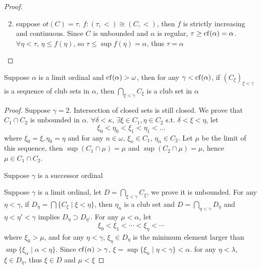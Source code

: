 \documentclass[11pt]{article}
\begin{document}
\begin{proof}
\begin{enumerate}
\setcounter{enumi}{1}
\item suppose \(ot(C)=\tau\). \(f:(\tau,<)\cong(C,<)\), then \(f\) is strictly increasing and
continuous. Since \(C\) is unbounded and \(\alpha\) is regular, \(\tau\ge\operatorname{cf}(\alpha)=\alpha\). \(\forall\eta<\tau\), \(\eta\le f(\eta)\),
so \(\tau\le\sup f(\eta)=\alpha\), thus \(\tau=\alpha\)
\end{enumerate}
\end{proof}

\begin{proposition}[]
\label{3.3.7}
Suppose \(\alpha\) is a limit ordinal and \(\operatorname{cf}(\alpha)>\omega\), then for any \(\gamma<\operatorname{cf}(\alpha)\), if \((C_\xi)_{\xi<\gamma}\) is
a sequence of club sets in \(\alpha\), then \(\bigcap_{\xi<\gamma}C_\xi\) is a club set in \(\alpha\)
\end{proposition}

\begin{proof}
Suppose \(\gamma=2\). Intersection of closed sets is still closed. We prove that \(C_1\cap C_2\) is
unbounded in \(\alpha\). \(\forall\delta<\kappa\), \(\exists\xi\in C_1,\eta\in C_2\) s.t. \(\delta<\xi<\eta\), let
\begin{equation*}
\xi_0<\eta_0<\xi_1<\eta_1<\dots
\end{equation*}
where \(\xi_0=\xi,\eta_0=\eta\) and for any \(n\in\omega\), \(\xi_n\in C_1\), \(\eta_n\in C_2\). Let \(\mu\) be the limit of this
sequence, then \(\sup(C_1\cap\mu)=\mu\) and \(\sup(C_2\cap \mu)=\mu\), hence \(\mu\in C_1\cap C_2\).

Suppose \(\gamma\) is a successor ordinal

Suppose \(\gamma\) is a limit ordinal, let \(D=\bigcap_{\xi<\gamma}C_\xi\), we prove it is unbounded. For any \(\eta<\gamma\),
if \(D_\eta=\bigcap\{C_\xi\mid\xi<\eta\}\), then \(\eta_n\) is a club set and \(D=\bigcap_{\eta<\gamma}D_\eta\) and \(\eta<\eta'<\gamma\)
implies \(D_\eta\supset D_{\eta'}\). For any \(\mu<\alpha\), let
\begin{equation*}
\xi_0<\xi_1<\cdots<\xi_\eta<\cdots
\end{equation*}
where \(\xi_0>\mu\), and for any \(\eta<\gamma\), \(\xi_\eta\in D_\eta\) is the minimum element larger
than \(\sup\{\xi_\alpha\mid\alpha<\eta\}\). Since \(\operatorname{cf}(\alpha)>\gamma\), \(\xi=\sup\{\xi_n\mid\eta<\gamma\}<\alpha\). for any \(\eta<\lambda\), \(\xi\in D_\eta\),
thus \(\xi\in D\) and \(\mu<\xi\)
\end{proof}
\end{document}
